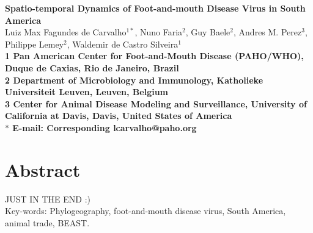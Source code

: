 \documentclass[10pt]{article}
\date{}
\begin{document}
\begin{flushleft}
{\Large
\textbf{Spatio-temporal Dynamics of Foot-and-mouth Disease Virus in South America}
}
\\
Luiz Max Fagundes de Carvalho$^{1\ast}$,
Nuno Faria$^{2}$,
Guy Baele$^{2}$,
Andres M. Perez$^{3}$,
Philippe Lemey$^{2}$,
Waldemir de Castro Silveira$^{1}$
\\
\bf{1} Pan American Center for Foot-and-Mouth Disease (PAHO/WHO), Duque de Caxias, Rio de Janeiro, Brazil
\\
\bf{2} Department of Microbiology and Immunology, Katholieke Universiteit Leuven, Leuven, Belgium
\\
\bf{3} Center for Animal Disease Modeling and Surveillance, University of California at Davis, Davis, United States of America
\\
$\ast$ E-mail: Corresponding lcarvalho@paho.org
\end{flushleft}

\section*{Abstract}

JUST IN THE END :)\\


Key-words: Phylogeography, foot-and-mouth disease virus, South America, animal trade, BEAST.
\end{document}
